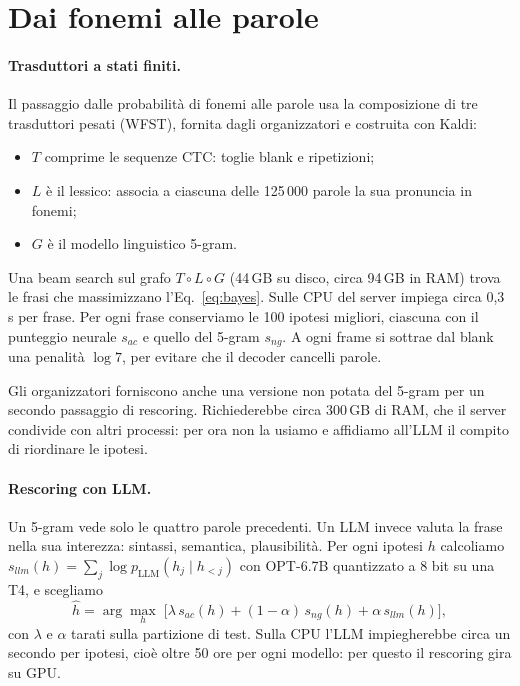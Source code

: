 \documentclass[10pt,a4paper]{article}
\begin{document}
\section{Dai fonemi alle parole}

\paragraph{Trasduttori a stati finiti.} Il passaggio dalle probabilità di fonemi alle parole usa la composizione di tre trasduttori pesati (WFST), fornita dagli organizzatori e costruita con Kaldi:
\begin{itemize}\setlength\itemsep{0pt}
\item $T$ comprime le sequenze CTC: toglie blank e ripetizioni;
\item $L$ è il lessico: associa a ciascuna delle 125\,000 parole la sua pronuncia in fonemi;
\item $G$ è il modello linguistico 5-gram.
\end{itemize}
Una beam search sul grafo $T\circ L\circ G$ (44\,GB su disco, circa 94\,GB in RAM) trova le frasi che massimizzano l'Eq.~\eqref{eq:bayes}. Sulle CPU del server impiega circa 0{,}3\,s per frase. Per ogni frase conserviamo le 100 ipotesi migliori, ciascuna con il punteggio neurale $s_{ac}$ e quello del 5-gram $s_{ng}$. A ogni frame si sottrae dal blank una penalità $\log 7$, per evitare che il decoder cancelli parole.

Gli organizzatori forniscono anche una versione non potata del 5-gram per un secondo passaggio di rescoring. Richiederebbe circa 300\,GB di RAM, che il server condivide con altri processi: per ora non la usiamo e affidiamo all'LLM il compito di riordinare le ipotesi.

\paragraph{Rescoring con LLM.} Un 5-gram vede solo le quattro parole precedenti. Un LLM invece valuta la frase nella sua interezza: sintassi, semantica, plausibilità. Per ogni ipotesi $h$ calcoliamo $s_{llm}(h)=\sum_j \log p_{\text{LLM}}(h_j\mid h_{<j})$ con OPT-6.7B quantizzato a 8 bit su una T4, e scegliamo
\begin{equation}
\hat h = \arg\max_h \;\big[\lambda\, s_{ac}(h) + (1-\alpha)\, s_{ng}(h) + \alpha\, s_{llm}(h)\big],
\end{equation}
con $\lambda$ e $\alpha$ tarati sulla partizione di test. Sulla CPU l'LLM impiegherebbe circa un secondo per ipotesi, cioè oltre 50 ore per ogni modello: per questo il rescoring gira su GPU.
\end{document}
